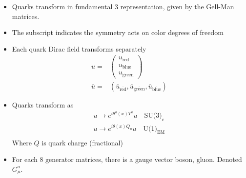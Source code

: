 \begin{itemize}
\begin{itemize}
        \item Quarks transform in {\color{red}fundamental 3} representation, given by the Gell-Man matrices. \cite{wells}
        \item The subscript indicates the symmetry acts on color degrees of freedom \cite{wells}
        \item Each quark Dirac field transforms separately \cite{wells}
        \begin{equation}\begin{split}
        u=&\begin{pmatrix}u_\text{red}\\u_\text{blue}\\u_\text{green}\end{pmatrix} \\
        \overline{u}=&(\overline{u}_{\overline{\text{red}}},\overline{u}_{\overline{\text{green}}},\overline{u}_{\overline{\text{blue}}})
        \end{split}\end{equation}
        \item Quarks transform as \cite{wells}
        \begin{equation}\begin{split}
        u\to e^{i\theta^a(x)T^a}u \quad\text{SU(3)}_c \\
        u\to e^{i\theta(x)Q_u}u \quad\text{U(1)}_\text{EM} \\
        \end{split}\end{equation}
        Where $Q$ is quark charge (fractional)
        \item For each 8 generator matrices, there is a gauge vector boson, gluon. Denoted $G_\mu^a$. \cite{wells}
    \end{itemize}


\end{itemize}
